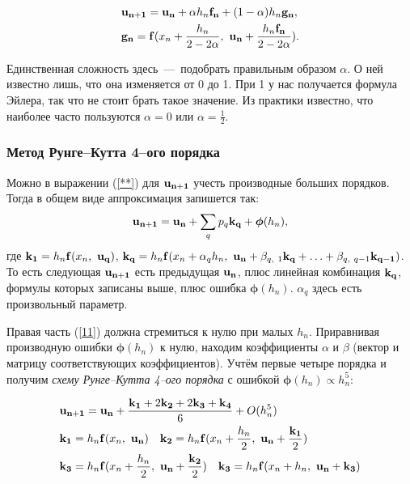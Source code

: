 \documentclass[a4paper,9pt,russian]{article}
\begin{document}
    \begin{equation}\label{RUNGE-KUTA}
    \begin{split}
        &{\bf u_{n+1}} = {\bf u_{n}} + \alpha h_n {\bf f_{n}} + (1 - \alpha) {h_n} {\bf g_{n}},\\
        &{\bf g_{n}} = {\bf f}(x_n + \frac{h_n}{2-2\alpha},\ {\bf u_{n}} + \frac{h_n {\bf f_{n}}}{2-2\alpha}).
    \end{split}
    \end{equation}
    
    Единственная сложность здесь~---~подобрать правильным образом $\alpha$. О ней известно лишь, что она изменяется от 0 до 1. При 1 у нас получается формула Эйлера, так что не стоит брать такое значение. Из практики известно, что наиболее часто пользуются $\alpha = 0$ или $\alpha = \frac12$.
\subsubsection{Метод Рунге--Кутта 4--ого порядка}
    Можно в выражении (\ref{**}) для ${\bf u_{n+1}}$ учесть производные больших порядков. Тогда в общем виде аппроксимация запишется так:
    \begin{equation}\label{11}
        {\bf u_{n+1}} = {\bf u_{n}} + \sum_q p_q {\bf k_q} + \boldsymbol{\phi} (h_n), 
    \end{equation}
    где ${\bf k_1}=h_n{\bf f}(x_n,\ {\bf u_q})$, ${\bf k_q}=h_n {\bf f}(x_n + \alpha_q h_n,\ {\bf u_{n}} + \beta_{q,\ 1} {\bf k_q} + \ldots + \beta_{q,\ q-1} {\bf k_{q-1}} )$. То есть следующая ${\bf u_{n+1}}$ есть предыдущая ${\bf u_{n}}$, плюс линейная комбинация ${\bf k_{q}}$, формулы которых записаны выше, плюс ошибка $\boldsymbol{\phi} (h_n)$. $\alpha_q$ здесь есть произвольный параметр.\par
    Правая часть (\ref{11}) должна стремиться к нулю при малых $h_n$. Приравнивая производную ошибки $\boldsymbol{\phi} (h_n)$ к нулю, находим коэффициенты $\alpha$ и $\beta$ (вектор и матрицу соответствующих коэффициентов). Учтём первые четыре порядка и получим {\it схему Рунге--Кутта 4--ого порядка} с ошибкой $\boldsymbol{\phi} (h_n) \propto h_n^5$:
    
    \begin{equation}\label{Runge-Kutta 4th}
        \begin{split}
        &{\bf u_{n+1}} = {\bf u_{n}} + \frac{{\bf k_1} +2{\bf k_2} + 2{\bf k_3}+{\bf k_4}}{6}+O(h_n^5) \\
        &{\bf k_1}=h_n{\bf f}(x_n,\ {\bf u_n}) \quad
        {\bf k_2}=h_n{\bf f}(x_n + \frac{h_n}2,\ {\bf u_n} + \frac{\bf k_1}{2})\\
        &{\bf k_3}=h_n{\bf f}(x_n + \frac{h_n}2,\ {\bf u_n} + \frac{\bf k_2}{2})\quad
        {\bf k_3}=h_n{\bf f}(x_n + h_n,\ {\bf u_n} + {\bf k_3})
        \end{split}
    \end{equation}
    
\end{document}
